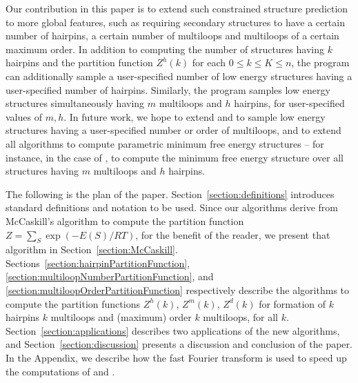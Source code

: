 Our contribution in this paper is to extend such constrained structure
prediction to more global features, such as requiring secondary structures
to have a certain number of hairpins, a certain number of multiloops and
multiloops of a certain maximum order.  In addition to computing the
number of structures having $k$ hairpins and the partition function $Z^h(k)$
for each $0 \leq k \leq K \leq n$, the program {\rnahairpin} can
additionally sample a user-specified number of low energy structures having a
user-specified number of hairpins.  Similarly, the program {\rnahairpinml}
samples low energy structures simultaneously having $m$ multiloops and
$h$ hairpins, for user-specified values of $m,h$.  In future work,
we hope to extend
{\rnamlnumber} and {\rnamlorder} to sample low energy structures having
a user-specified number or order of multiloops, and to extend all algorithms
to compute parametric minimum free energy structures -- for instance, in the
case of {\rnahairpinml}, to compute the minimum free energy structure over
all structures having $m$ multiloops and $h$ hairpins.

The following is the plan of the paper.
Section~\ref{section:definitions} introduces standard definitions and
notation to be used. Since our algorithms derive from
McCaskill's algorithm \citep{mcCaskill} to compute the partition function
$Z= \sum_{S} \exp(-E(S)/RT)$, for the benefit of the reader, we present
that algorithm in Section~\ref{section:McCaskill}.
Sections~\ref{section:hairpinPartitionFunction},
\ref{section:multiloopNumberPartitionFunction}, and
\ref{section:multiloopOrderPartitionFunction}
respectively describe the algorithms to compute the partition functions
$Z^h(k)$, $Z^m(k)$, $Z^d(k)$ for formation of $k$ hairpins
$k$ multiloops and (maximum) order $k$ multiloops, for all $k$.
Section~\ref{section:applications} describes two applications of the
new algorithms, and Section~\ref{section:discussion} presents a
discussion and conclusion of the paper. In the Appendix, we describe
how the fast Fourier transform is used to speed up the computations of
{\rnahairpin} and {\rnamlnumber}.




